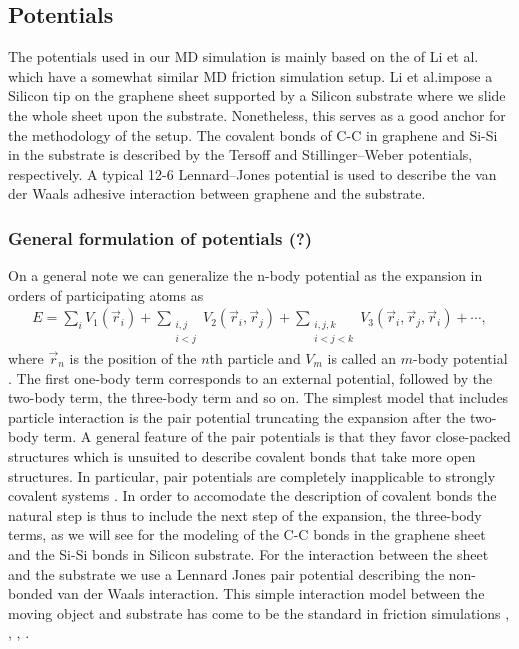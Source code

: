 


\subsection{Potentials}


The potentials used in our MD simulation is mainly based on the of Li et al.
\cite{li_evolving_2016} which have a somewhat similar MD friction simulation
setup. Li et al.impose a Silicon tip on the graphene sheet supported by a
Silicon substrate where we slide the whole sheet upon the substrate.
Nonetheless, this serves as a good anchor for the methodology of the setup. The
covalent bonds of C-C in graphene and Si-Si in the substrate is described by the
Tersoff and Stillinger–Weber potentials, respectively. A typical 12-6
Lennard–Jones potential is used to describe the van der Waals adhesive
interaction between graphene and the substrate. 

\subsubsection{General formulation of potentials (?)}
On a general note we can generalize the n-body potential as the expansion in
orders of participating atoms as 
\begin{align*}
  E = \sum_i V_1(\vec{r}_i) + 
      \sum_{\substack{i, j \\ i < j}} V_2(\vec{r}_i, \vec{r}_j) +  
      \sum_{\substack{i,j,k \\ i < j < k}} V_3(\vec{r}_i, \vec{r}_j, \vec{r}_i) + \cdots,
\end{align*} 
where $\vec{r}_n$ is the position of the $n$th particle and $V_m$ is called an
$m$-body potential  \cite{PhysRevB.37.6991}. The first one-body term corresponds
to an external potential, followed by the two-body term, the three-body term and
so on. The simplest model that includes particle interaction is the pair
potential truncating the expansion after the two-body term. A general feature of
the pair potentials is that they favor close-packed structures which is unsuited
to describe covalent bonds that take more open structures. In particular, pair
potentials are completely inapplicable to strongly covalent systems \cite{PhysRevB.37.6991}. In order to accomodate the description
of covalent bonds the natural step is thus to include the next step of the
expansion, the three-body terms, as we will see for the modeling of the C-C bonds in the graphene sheet and the Si-Si bonds in Silicon substrate. For the interaction between
the sheet and the substrate we use a Lennard Jones pair potential
describing the non-bonded van der Waals interaction. This simple interaction model between the moving object and substrate has come to be the standard in friction simulations \cite{zhu_study_2018}, \cite{ZHANG201585}, \cite{Yoon2015MolecularDS}, \cite{kim_nano-scale_2009}. 


